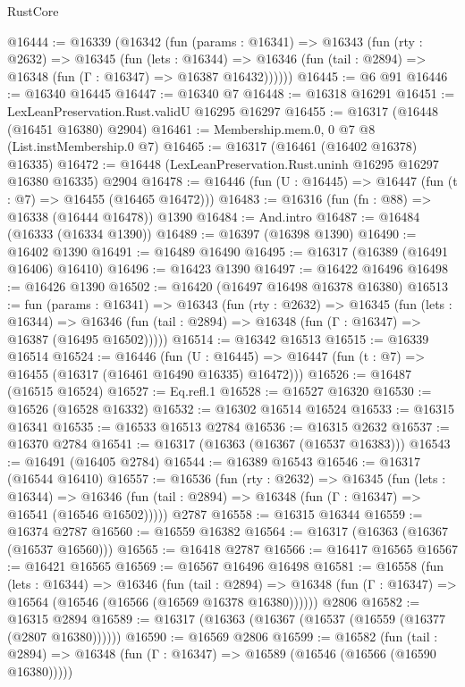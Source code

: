 \begin{lexlean}{RustCore}
\begin{coremodule}
@16444 := @16339
    (@16342
      (fun (params : @16341) =>
      @16343
        (fun (rty : @2632) =>
        @16345
          (fun (lets : @16344) =>
          @16346 (fun (tail : @2894) => @16348 (fun (Γ : @16347) => @16387 @16432))))))
@16445 := @6 @91
@16446 := @16340 @16445
@16447 := @16340 @7
@16448 := @16318 @16291
@16451 := LexLeanPreservation.Rust.validU @16295 @16297
@16455 := @16317 (@16448 (@16451 @16380) @2904)
@16461 := Membership.mem.{0, 0} @7 @8 (List.instMembership.{0} @7)
@16465 := @16317 (@16461 (@16402 @16378) @16335)
@16472 := @16448 (LexLeanPreservation.Rust.uninh @16295 @16297 @16380 @16335) @2904
@16478 := @16446 (fun (U : @16445) => @16447 (fun (t : @7) => @16455 (@16465 @16472)))
@16483 := @16316 (fun (fn : @88) => @16338 (@16444 @16478)) @1390
@16484 := And.intro
@16487 := @16484 (@16333 (@16334 @1390))
@16489 := @16397 (@16398 @1390)
@16490 := @16402 @1390
@16491 := @16489 @16490
@16495 := @16317 (@16389 (@16491 @16406) @16410)
@16496 := @16423 @1390
@16497 := @16422 @16496
@16498 := @16426 @1390
@16502 := @16420 (@16497 @16498 @16378 @16380)
@16513 := fun (params : @16341) =>
  @16343
    (fun (rty : @2632) =>
    @16345
      (fun (lets : @16344) =>
      @16346 (fun (tail : @2894) => @16348 (fun (Γ : @16347) => @16387 (@16495 @16502)))))
@16514 := @16342 @16513
@16515 := @16339 @16514
@16524 := @16446
    (fun (U : @16445) => @16447 (fun (t : @7) => @16455 (@16317 (@16461 @16490 @16335) @16472)))
@16526 := @16487 (@16515 @16524)
@16527 := Eq.refl.{1}
@16528 := @16527 @16320
@16530 := @16526 (@16528 @16332)
@16532 := @16302 @16514 @16524
@16533 := @16315 @16341
@16535 := @16533 @16513 @2784
@16536 := @16315 @2632
@16537 := @16370 @2784
@16541 := @16317 (@16363 (@16367 (@16537 @16383)))
@16543 := @16491 (@16405 @2784)
@16544 := @16389 @16543
@16546 := @16317 (@16544 @16410)
@16557 := @16536
    (fun (rty : @2632) =>
    @16345
      (fun (lets : @16344) =>
      @16346 (fun (tail : @2894) => @16348 (fun (Γ : @16347) => @16541 (@16546 @16502)))))
    @2787
@16558 := @16315 @16344
@16559 := @16374 @2787
@16560 := @16559 @16382
@16564 := @16317 (@16363 (@16367 (@16537 @16560)))
@16565 := @16418 @2787
@16566 := @16417 @16565
@16567 := @16421 @16565
@16569 := @16567 @16496 @16498
@16581 := @16558
    (fun (lets : @16344) =>
    @16346
      (fun (tail : @2894) =>
      @16348 (fun (Γ : @16347) => @16564 (@16546 (@16566 (@16569 @16378 @16380))))))
    @2806
@16582 := @16315 @2894
@16589 := @16317 (@16363 (@16367 (@16537 (@16559 (@16377 (@2807 @16380))))))
@16590 := @16569 @2806
@16599 := @16582
    (fun (tail : @2894) => @16348 (fun (Γ : @16347) => @16589 (@16546 (@16566 (@16590 @16380)))))

\end{coremodule}
\end{lexlean}
